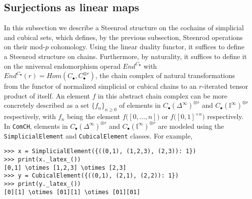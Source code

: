 \documentclass{amsart}
\newcommand{\comch}{\texttt{ComCH}}
\begin{document}
\subsection{Surjections as linear maps}

In this subsection we describe a Steenrod structure on the cochains of simplicial and cubical sets, which defines, by the previous subsection, Steenrod operations on their mod-$p$ cohomology. Using the linear duality functor, it suffices to define a Steenrod structure on chains. Furthermore, by naturality, it suffices to define it on the universal endomorphism operad $End^{C_\bullet}$ with $End^{C_\bullet}(r) = Hom(C_\bullet, C_\bullet^{\otimes r})$, the chain complex of natural transformations from the functor of normalized simplicial or cubical chains to an $r$-iterated tensor product of itself. An element $f$ in this abstract chain complex can be more concretely described as a set $\{f_n\}_{n \geq 0}$ of elements in $C_\bullet(\Delta^\infty)^{\otimes r}$ and $C_\bullet(\mathbb I^\infty)^{\otimes r}$ respectively, with $f_n$ being the element $f\big([0, \dots, n]\big)$ or $f\big([0 ,1]^{\times n} \big)$ respectively. In \comch, elements in $C_\bullet(\Delta^\infty)^{\otimes r}$ and $C_\bullet(\mathbb I^\infty)^{\otimes r}$ are modeled using the \texttt{SimplicialElement} and \texttt{CubicalElement} classes. For example,

\begin{Verbatim}[frame=single, samepage=true]
>>> x = SimplicialElement({((0,1), (1,2,3), (2,3)): 1})
>>> print(x._latex_())
[0,1] \otimes [1,2,3] \otimes [2,3]
>>> y = CubicalElement({((0,1), (2,1), (2,2)): 1})
>>> print(y._latex_())
[0][1] \otimes [01][1] \otimes [01][01]
\end{Verbatim}
\end{document}
